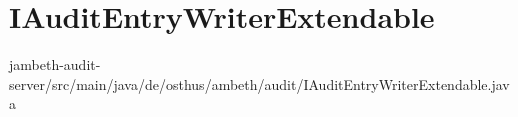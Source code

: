 \section{IAuditEntryWriterExtendable}
\label{extendable:IAuditEntryWriterExtendable}
	{jambeth-audit-server/src/main/java/de/osthus/ambeth/audit/IAuditEntryWriterExtendable.java}

